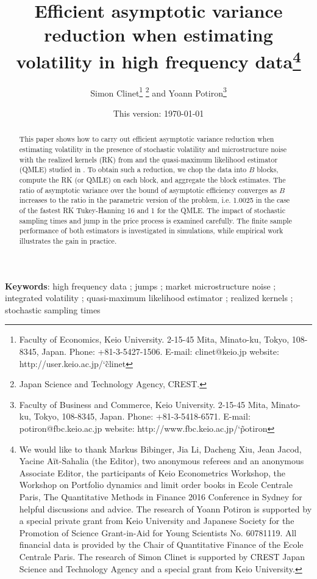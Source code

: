 \documentclass[11pt]{article}
\numberwithin{equation}{section}
\theoremstyle{plain}
\theoremstyle{remark}
\begin{document}
 \title{Efficient asymptotic variance reduction when estimating volatility in high frequency data\footnote{We would like to thank Markus Bibinger, Jia Li, Dacheng Xiu, Jean Jacod, Yacine A\"{i}t-Sahalia (the Editor), two anonymous referees and an anonymous Associate Editor, the participants of Keio Econometrics Workshop, the Workshop on Portfolio dynamics and limit order books in Ecole Centrale Paris, The Quantitative Methods in Finance 2016 Conference in Sydney for helpful discussions and advice. The research of Yoann Potiron is supported by a special private grant from Keio University and Japanese Society for the Promotion of Science Grant-in-Aid for Young Scientists No. 60781119. All financial data is provided by the Chair of Quantitative Finance of the Ecole Centrale Paris. The research of Simon Clinet is supported by CREST Japan
Science and Technology Agency and a special grant from Keio University.}}
\author{Simon Clinet\footnote{Faculty of Economics, Keio University. 2-15-45 Mita, Minato-ku, Tokyo, 108-8345, Japan. Phone:  +81-3-5427-1506. E-mail: clinet@keio.jp website: http://user.keio.ac.jp/\char`\~ clinet} \footnote{Japan Science and Technology Agency, CREST.}  and Yoann Potiron\footnote{Faculty of Business and Commerce, Keio University. 2-15-45 Mita, Minato-ku, Tokyo, 108-8345, Japan. Phone:  +81-3-5418-6571. E-mail: potiron@fbc.keio.ac.jp website: http://www.fbc.keio.ac.jp/\char`\~ potiron}}
\date{This version: \today} 

\maketitle

\begin{abstract}
This paper shows how to carry out efficient asymptotic variance reduction when estimating volatility in the presence of stochastic volatility and microstructure noise with the realized kernels (RK) from \cite{barndorff2008designing} and the quasi-maximum likelihood estimator (QMLE) studied in \cite{xiu2010quasi}. To obtain such a reduction, we chop the data into $B$ blocks, compute the RK (or QMLE) on each block, and aggregate the block estimates. The ratio of asymptotic variance over the bound of asymptotic efficiency converges as $B$ increases to the ratio in the parametric version of the problem, i.e. 1.0025 in the case of the fastest RK Tukey-Hanning 16 and 1 for the QMLE. The impact of stochastic sampling times and jump in the price process is examined carefully. The finite sample performance of both estimators is investigated in simulations, while empirical work illustrates the gain in practice.

\end{abstract}
\textbf{Keywords}: high frequency data ; jumps ; market microstructure noise ; integrated volatility ; quasi-maximum likelihood estimator ; realized kernels ; stochastic sampling times
\\
\end{document}
